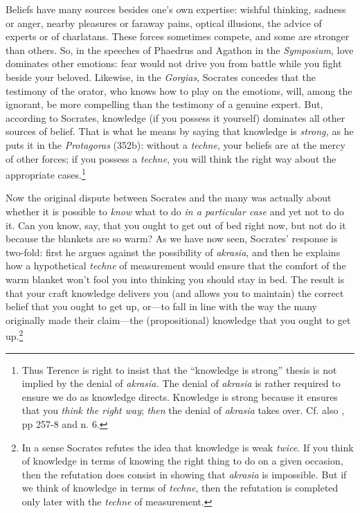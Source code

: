 ﻿\documentclass[11pt]{amsart}
\begin{document}
Beliefs have many sources besides one's own expertise: wishful thinking, sadness or anger, nearby pleasures or faraway pains, optical illusions, the advice of experts or of charlatans. These forces sometimes compete, and some are stronger than others. So, in the speeches of Phaedrus and Agathon in the \emph{Symposium,} love dominates other emotions: fear would not drive you from battle while you fight beside your beloved. Likewise, in the \emph{Gorgias}, Socrates concedes that the testimony of the orator, who knows how to play on the emotions, will, among the ignorant, be more compelling than the testimony of a genuine expert. But, according to Socrates, knowledge (if you possess it yourself) dominates all other sources of belief. That is what he means by saying that knowledge is \emph{strong,} as he puts it in the \emph{Protagoras} (352b): without a \emph{techne}, your beliefs are at the mercy of other forces; if you possess a \emph{techne}, you will think the right way about the appropriate cases.\footnote{Thus Terence \citet{penner1997ssk} is right to insist that the ``knowledge is strong'' thesis is not implied by the denial of \emph{akrasia.} The denial of \emph{akrasia} is rather required to ensure we do as knowledge directs. Knowledge is strong because it ensures that you \emph{think the right way}; \emph{then} the denial of \emph{akrasia} takes over. Cf. also \citet{allen1960sp}, pp 257-8 and n. 6.}



Now the original dispute between Socrates and the many was actually about whether it is possible to \emph{know} what to do \emph{in a particular case} and yet not to do it. Can you know, say, that you ought to get out of bed right now, but not do it because the blankets are so warm? As we have now seen, Socrates' response is two-fold: first he argues against the possibility of \emph{akrasia}, and then he explains how a hypothetical \emph{techne} of measurement would ensure that the comfort of the warm blanket won't fool you into thinking you should stay in bed. The result is that your craft knowledge delivers you (and allows you to maintain) the correct belief that you ought to get up, or---to fall in line with the way the many originally made their claim---the (propositional) knowledge that you ought to get up.\footnote{In a sense Socrates refutes the idea that knowledge is weak \emph{twice}. If you think of knowledge in terms of knowing the right thing to do on a given occasion, then the refutation does consist in showing that \emph{akrasia} is impossible. But if we think of knowledge in terms of \emph{techne}, then the refutation is completed only later with the \emph{techne} of measurement.}
\end{document}
